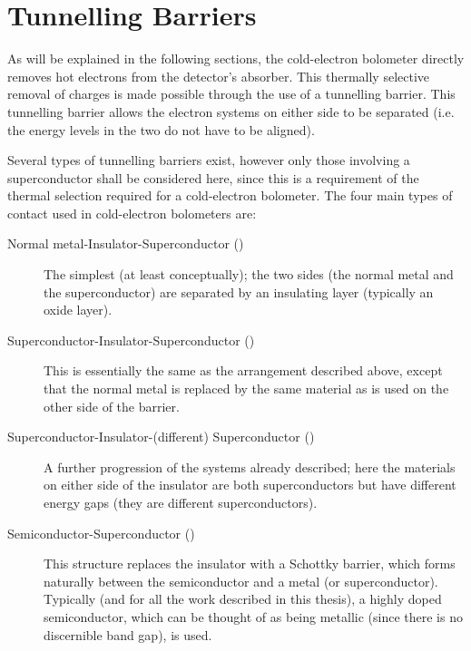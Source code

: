 \section{Tunnelling Barriers}\label{sec:tunnelling-barreirs}
As will be explained in the following sections, the cold-electron bolometer directly removes hot electrons from the detector's absorber. This thermally selective removal of charges is made possible through the use of a tunnelling barrier. This tunnelling barrier allows the electron systems on either side to be separated (i.e. the energy levels in the two do not have to be aligned). 
\par 
Several types of tunnelling barriers exist, however only those involving a superconductor shall be considered here, since this is a requirement of the thermal selection required for a cold-electron bolometer. The four main types of contact used in cold-electron bolometers are:
\begin{description}
\item[Normal metal-Insulator-Superconductor ()] The simplest (at least conceptually); the two sides (the normal metal and the superconductor) are separated by an insulating layer (typically an oxide layer).
\item[Superconductor-Insulator-Superconductor ()] This is essentially the same as the arrangement described above, except that the normal metal is replaced by the same material as is used on the other side of the barrier.
\item[Superconductor-Insulator-(different) Superconductor ()] A further progression of the systems already described; here the materials on either side of the insulator are both superconductors but have different energy gaps (they are different superconductors).
\item[Semiconductor-Superconductor ()] This structure replaces the insulator with a Schottky barrier, which forms naturally between the semiconductor and a metal (or superconductor). Typically (and for all the work described in this thesis), a highly doped semiconductor, which can be thought of as being metallic (since there is no discernible band gap), is used.
\end{description}

